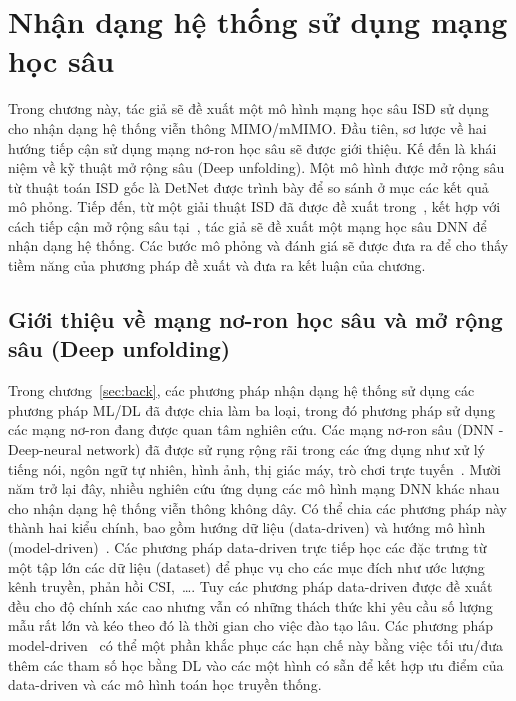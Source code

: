 \clearpage
{}

\setcounter{chapter}{2}
\chapter[NHẬN DẠNG HỆ THỐNG SỬ DỤNG MẠNG HỌC SÂU]{Nhận dạng hệ thống sử dụng mạng học sâu}
\label{sec:ML}

Trong chương này, tác giả sẽ đề xuất một mô hình mạng học sâu ISD sử dụng cho nhận dạng hệ thống viễn thông MIMO/mMIMO. Đầu tiên, sơ lược về hai hướng tiếp cận sử dụng mạng nơ-ron học sâu sẽ được giới thiệu. Kế đến là khái niệm về kỹ thuật mở rộng sâu (Deep unfolding). Một mô hình được mở rộng sâu từ thuật toán ISD gốc là DetNet được trình bày để so sánh ở mục các kết quả mô phỏng. Tiếp đến, từ một giải thuật ISD đã được đề xuất trong~\cite{Mandloi2017}, kết hợp với cách tiếp cận mở rộng sâu tại~\cite{Liao2020}, tác giả sẽ đề xuất một mạng học sâu DNN để nhận dạng hệ thống. Các bước mô phỏng và đánh giá sẽ được đưa ra để cho thấy tiềm năng của phương pháp đề xuất và đưa ra kết luận của chương. 

\section{Giới thiệu về mạng nơ-ron học sâu và mở rộng sâu (Deep unfolding)}

Trong chương~\ref{sec:back}, các phương pháp nhận dạng hệ thống sử dụng các phương pháp ML/DL đã được chia làm ba loại, trong đó phương pháp sử dụng các mạng nơ-ron đang được quan tâm nghiên cứu. Các mạng nơ-ron sâu (DNN - Deep-neural network) đã được sử rụng rộng rãi trong các ứng dụng như xử lý tiếng nói, ngôn ngữ tự nhiên, hình ảnh, thị giác máy, trò chơi trực tuyến~\cite{Samek2021}. Mười năm trở lại đây, nhiều nghiên cứu ứng dụng các mô hình mạng DNN khác nhau cho nhận dạng hệ thống viễn thông không dây. Có thể chia các phương pháp này thành hai kiểu chính, bao gồm hướng dữ liệu (data-driven) và hướng mô hình (model-driven)~\cite{Liao2020}. Các phương pháp data-driven trực tiếp học các đặc trưng từ một tập lớn các dữ liệu (dataset) để phục vụ cho các mục đích như ước lượng kênh truyền, phản hồi CSI,~\ldots. Tuy các phương pháp data-driven được đề xuất đều cho độ chính xác cao nhưng vẫn có những thách thức khi yêu cầu số lượng mẫu rất lớn và kéo theo đó là thời gian cho việc đào tạo lâu. Các phương pháp model-driven~\cite{He2019} có thể một phần khắc phục các hạn chế này bằng việc tối ưu/đưa thêm các tham số học bằng DL vào các một hình có sẵn để kết hợp ưu điểm của data-driven và các mô hình toán học truyền thống. 

